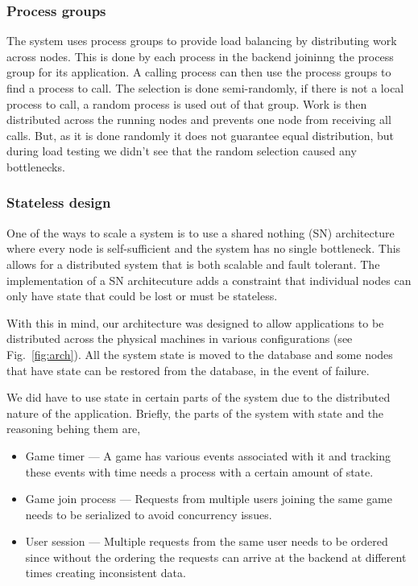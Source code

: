 \documentclass[11pt,a4paper]{report}
\begin{document}
\subsubsection{Process groups}
\label{sec:process_groups}
The system uses process groups to provide load balancing by distributing work
across nodes.
This is done by each process in the backend joininng the process group for its
application. A calling process can then use the process groups to find a
process to call. The selection is done semi-randomly, if there is not a local
process to call, a random process is used out of that group.
Work is then distributed across the running nodes and prevents one node from 
receiving all calls. But, as it is done randomly it does not guarantee equal
distribution, but during load testing we didn't see that the random selection
caused any bottlenecks.

\subsubsection{Stateless design}
One of the ways to scale a system is to use a shared nothing (SN) architecture
where every node is self-sufficient and the system has no single bottleneck.
This allows for a distributed system that is both scalable and fault tolerant.
The implementation of a SN architecuture adds a constraint that individual
nodes can only have state that could be lost or must be stateless.

With this in mind, our architecture was designed to allow applications to
be distributed across the physical machines in various configurations
(see Fig.~\ref{fig:arch}). All the system state is moved to the database
and some nodes that have state can be restored from the database, in
the event of failure.

We did have to use state in certain parts of the system due to the
distributed nature of the application. Briefly, the parts of the system
with state and the reasoning behing them are,

\begin{itemize}
\item Game timer --- A game has various events associated with it and
tracking these events with time needs a process with a certain amount
of state.
\item Game join process --- Requests from multiple users joining the same
game needs to be serialized to avoid concurrency issues.
\item User session --- Multiple requests from the same user needs to be
ordered since without the ordering the requests can arrive at the backend
at different times creating inconsistent data.
\end{itemize}
\end{document}
